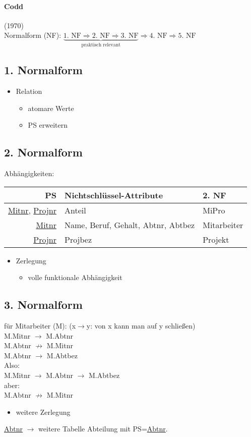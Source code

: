 \paragraph{Codd} (1970)\\
Normalform (NF):
$\underbrace{\text{1. NF} \Rightarrow \text{2. NF} \Rightarrow \text{3. NF}}_{\text{praktisch relevant}}\Rightarrow\text{4. NF}\Rightarrow\text{5. NF}$
\subsection{1. Normalform}
\begin{itemize}[label=$\Rightarrow$]
\item Relation
\begin{itemize}
\item atomare Werte
\item PS erweitern
\end{itemize}
\end{itemize}
\subsection{2. Normalform}
Abhängigkeiten:\\
\begin{tabular}{r | l | l}
PS & Nichtschlüssel-Attribute & 2. NF\\
\hline
\underline{Mitnr}, \underline{Projnr} & Anteil & MiPro\\
\underline{Mitnr} & Name, Beruf, Gehalt, Abtnr, Abtbez & Mitarbeiter\\
\underline{Projnr} & Projbez & Projekt
\end{tabular}
\begin{itemize}[label=$\Rightarrow$]
\item Zerlegung
\begin{itemize}
\item volle funktionale Abhängigkeit
\end{itemize}
\end{itemize}
\subsection{3. Normalform}
für Mitarbeiter (M): (x$\to$y: von x kann man auf y schließen)\\
M.Mitnr $\to$ M.Abtnr\\
M.Abtnr $\not \to$ M.Mitnr\\
M.Abtnr $\to$ M.Abtbez\\
Also:\\
M.Mitnr $\to$ M.Abtnr $\to$ M.Abtbez\\
aber:\\
M.Abtnr $\not \to$ M.Mitnr
\begin{itemize}[label=$\Rightarrow$]
\item weitere Zerlegung
\end{itemize}
\underline{Abtnr} $\to$ weitere Tabelle Abteilung mit PS=\underline{Abtnr}.

